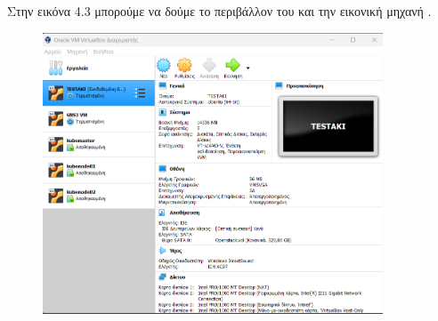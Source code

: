 Στην εικόνα 4.3 μπορούμε να δούμε το περιβάλλον του  και την εικονική μηχανή .

\begin{figure}[htb]
	\centering
	\includegraphics[width=0.9\textwidth]{graphics/virtualbox.PNG}
	\caption{ }
\end{figure}






